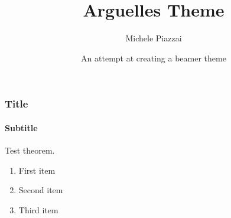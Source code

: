 \documentclass{beamer}
\title{Arguelles Theme}
\date[\today]{An attempt at creating a beamer theme}
\author[Myself]{Michele Piazzai}
\begin{document}
\frame{\titlepage}

\begin{frame}
\frametitle{Title}
\framesubtitle{Subtitle}

\begin{theorem}
Test theorem.
\end{theorem}

\begin{enumerate}
\item First item
\item Second item
\item Third item
\end{enumerate}

\end{frame}
\end{document}

